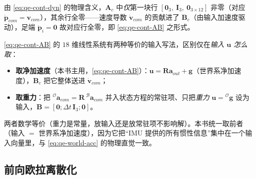 \begin{note}\label{note:qe-ocr-Ac}
由 \cref{eq:qe-cont-dyn} 的物理含义，$\mathbf{A}_c$ 中\emph{仅}第一块行 $[\mathbf{0}_3,\ \mathbf{I}_3,\ \mathbf{0}_{3\times12}]$ 非零（对应 $\dot{\boldsymbol p}_{com}={\boldsymbol v}_{com}$），其余行全零——速度导数 $\dot{\boldsymbol v}_{com}$ 的贡献进了 $\mathbf{B}_c$（由输入加速度驱动），足端 $\dot{\boldsymbol p}_i=\boldsymbol 0$ 故对应行全零，即 \cref{eq:qe-cont-AB} 之形式。
\end{note}

\begin{note}\label{note:qe-two-input}
\cref{eq:qe-cont-AB} 的 $18$ 维线性系统有两种等价的输入写法，区别仅在\emph{输入 $\boldsymbol u$ 怎么取}：
\begin{itemize}
  \item \textbf{取净加速度}（本书主用，\cref{eq:qe-cont-AB}）：$\boldsymbol u=\mathbf{R}\boldsymbol a_{out}+\boldsymbol g$（世界系净加速度），$\mathbf{B}_c$ 把它整体送进 $\dot{\boldsymbol v}_{com}$；
  \item \textbf{取重力}：把 ${}^{\mathcal{O}}\boldsymbol a_{com}=\mathbf{R}\,{}^{\mathcal{B}}\boldsymbol a_{com}$ 并入状态方程的常驻项、只把\emph{重力} $\boldsymbol u={}^{\mathcal{O}}\boldsymbol g$ 设为输入，$\mathbf{B}=[\mathbf{0};\Delta t\,\mathbf{I}_3;\mathbf{0}]$。
\end{itemize}
两者数学等价（重力是常量，放输入还是放常驻项不影响解）。本书统一取前者（输入 $=$ 世界系净加速度），因为它把“IMU 提供的所有惯性信息”集中在一个输入向量里，与 \cref{eq:qe-world-acc} 的物理直觉一致。
\end{note}

\subsection{前向欧拉离散化}
\label{subsec:qe-disc}

